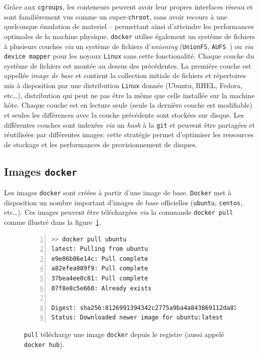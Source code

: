 \documentclass[a4paper]{article}
\begin{document}
Gr\^ace aux \texttt{cgroups}, les conteneurs peuvent avoir leur propres
interfaces r\'eseau et sont famili\`erement vus comme un super-\texttt{chroot},
sans avoir recours \`a une quelconque \'emulation de materiel -- permettant
ainsi d'atteindre les performances optimales de la machine physique.
\texttt{docker} utilise \'egalement un syst\`eme de fichiers \`a plusieurs
couches \emph{via} un syst\`eme de fichiers d'\emph{unioning}
(\texttt{UnionFS}\cite{ref-unionfs}, \texttt{AUFS}~\cite{ref-aufs}) ou
\emph{via} \texttt{device mapper} pour les noyaux \texttt{Linux} sans cette
fonctionalit\'e.
Chaque couche du syst\`eme de fichiers est mont\'ee au dessus des
pr\'ec\'edentes.
La premi\`ere couche est appell\'ee \emph{image de base} et contient la
collection initiale de fichiers et r\'epertoires mis \`a disposition par une
distribution \texttt{Linux} donn\'ee (Ubuntu, RHEL, Fedora, etc\ldots),
distribution qui peut ne pas \^etre la m\^eme que celle install\'ee sur la
machine h\^ote.
Chaque couche est en lecture seule (seule la derni\`ere couche est modifiable)
et seules les diff\'erences avec la couche pr\'ec\'edente sont stock\'ees sur
disque.
Les diff\'erentes couches sont index\'ees \emph{via} un \emph{hash} \`a la
\texttt{git} et peuvent \^etre partag\'ees et r\'eutilis\'ees par diff\'erentes
images: cette strat\'egie permet d'optimiser les ressources de stockage et les
performances de provisionnement de disques.

\subsection*{Images \texttt{docker}}

Les images \texttt{docker} sont cr\'e\'ees \`a partir d'une image de base.
\texttt{Docker} met \`a disposition un nombre important d'images de base
officielles (\texttt{ubuntu}, \texttt{centos}, etc\ldots).
Ces images peuvent \^etre t\'el\'echarg\'ees \emph{via} la commande
\texttt{docker pull} comme illustr\'e dans la figure~\ref{fig-docker-pull}.

\begin{figure}[h]
\begin{lstlisting}[language=sh,
    basicstyle=\tiny,
    frame=trbl,
    numbers=left,
    showstringspaces=false,
    stringstyle=\ttfamily]
>> docker pull ubuntu
latest: Pulling from ubuntu
e9e06b06e14c: Pull complete 
a82efea989f9: Pull complete 
37bea4ee0c81: Pull complete 
07f8e8c5e660: Already exists 

Digest: sha256:8126991394342c2775a9ba4a843869112da8156037451fc424454db43c25d8b0
Status: Downloaded newer image for ubuntu:latest
\end{lstlisting}
\caption{\label{fig-docker-pull}\texttt{pull} t\'el\'echarge une image
	\texttt{docker} depuis le registre (aussi appel\'e \texttt{docker hub}).}
\end{figure}
\end{document}
